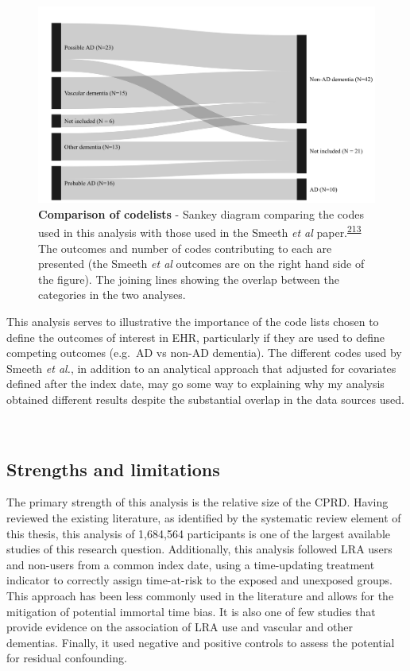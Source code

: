 \documentclass[a4paper, twoside]{templates/ociamthesis}
\begin{document}
\begin{figure}[H]
\includegraphics[width=1\linewidth]{figures/cprd-analysis/sankey_diagram} \caption[Comparison of codelists]{\textbf{Comparison of codelists} - Sankey diagram comparing the codes used in this analysis with those used in the Smeeth \emph{et al} paper.\textsuperscript{\protect\hyperlink{ref-smeeth2009}{213}} The outcomes and number of codes contributing to each are presented (the Smeeth \emph{et al} outcomes are on the right hand side of the figure). The joining lines showing the overlap between the categories in the two analyses.}\label{fig:smeethComparison}
\end{figure}

This analysis serves to illustrative the importance of the code lists chosen to define the outcomes of interest in EHR, particularly if they are used to define competing outcomes (e.g.~AD vs non-AD dementia). The different codes used by Smeeth \emph{et al.}, in addition to an analytical approach that adjusted for covariates defined after the index date, may go some way to explaining why my analysis obtained different results despite the substantial overlap in the data sources used.

~

\hypertarget{cprd-limitations}{%
\subsection{Strengths and limitations}\label{cprd-limitations}}

The primary strength of this analysis is the relative size of the CPRD. Having reviewed the existing literature, as identified by the systematic review element of this thesis, this analysis of 1,684,564 participants is one of the largest available studies of this research question. Additionally, this analysis followed LRA users and non-users from a common index date, using a time-updating treatment indicator to correctly assign time-at-risk to the exposed and unexposed groups. This approach has been less commonly used in the literature and allows for the mitigation of potential immortal time bias. It is also one of few studies that provide evidence on the association of LRA use and vascular and other dementias. Finally, it used negative and positive controls to assess the potential for residual confounding.
\end{document}

